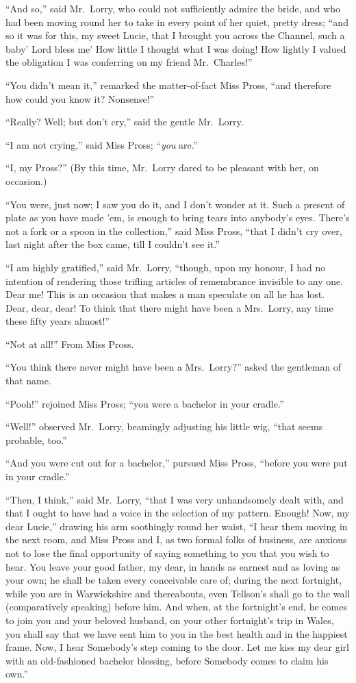 ``And so,'' said Mr.\ Lorry, who could not sufficiently admire the bride,
and who had been moving round her to take in every point of her quiet,
pretty dress; ``and so it was for this, my sweet Lucie, that I brought
you across the Channel, such a baby' Lord bless me' How little I
thought what I was doing!  How lightly I valued the obligation I was
conferring on my friend Mr.\ Charles!''

``You didn't mean it,'' remarked the matter-of-fact Miss Pross, ``and
therefore how could you know it?  Nonsense!''

``Really?  Well; but don't cry,'' said the gentle Mr.\ Lorry.

``I am not crying,'' said Miss Pross; ``\emph{you} are.''

``I, my Pross?'' (By this time, Mr.\ Lorry dared to be pleasant with
her, on occasion.)

``You were, just now; I saw you do it, and I don't wonder at it.  Such
a present of plate as you have made 'em, is enough to bring tears into
anybody's eyes.  There's not a fork or a spoon in the collection,''
said Miss Pross, ``that I didn't cry over, last night after the box came,
till I couldn't see it.''

``I am highly gratified,'' said Mr.\ Lorry, ``though, upon my honour, I
had no intention of rendering those trifling articles of remembrance
invisible to any one.  Dear me!  This is an occasion that makes a man
speculate on all he has lost.  Dear, dear, dear!  To think that there
might have been a Mrs.\ Lorry, any time these fifty years almost!''

``Not at all!''  From Miss Pross.

``You think there never might have been a Mrs.\ Lorry?'' asked the
gentleman of that name.

``Pooh!'' rejoined Miss Pross; ``you were a bachelor in your cradle.''

``Well!'' observed Mr.\ Lorry, beamingly adjusting his little wig,
``that seems probable, too.''

``And you were cut out for a bachelor,'' pursued Miss Pross, ``before
you were put in your cradle.''

``Then, I think,'' said Mr.\ Lorry, ``that I was very unhandsomely dealt
with, and that I ought to have had a voice in the selection of my
pattern.  Enough!  Now, my dear Lucie,'' drawing his arm soothingly
round her waist, ``I hear them moving in the next room, and Miss Pross
and I, as two formal folks of business, are anxious not to lose the
final opportunity of saying something to you that you wish to hear.
You leave your good father, my dear, in hands as earnest and as
loving as your own; he shall be taken every conceivable care of;
during the next fortnight, while you are in Warwickshire and thereabouts,
even Tellson's shall go to the wall (comparatively speaking) before him.
And when, at the fortnight's end, he comes to join you and your beloved
husband, on your other fortnight's trip in Wales, you shall say that
we have sent him to you in the best health and in the happiest frame.
Now, I hear Somebody's step coming to the door.  Let me kiss my dear
girl with an old-fashioned bachelor blessing, before Somebody comes
to claim his own.''

